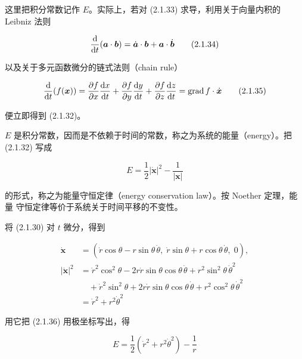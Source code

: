 这里把积分常数记作 $E$。实际上，若对 (2.1.33) 求导，利用关于向量内积的
Leibniz 法则

\begin{equation}
  \frac{\mathrm{d}}{\mathrm{d} t}(\bm{a}\cdot\bm{b})
    = \dot{\bm{a}}\cdot\bm{b} + \bm{a}\cdot\dot{\bm{b}}
  \tag{2.1.34}
\end{equation}

以及关于多元函数微分的链式法则（chain rule）

\begin{equation}
  \frac{\mathrm{d}}{\mathrm{d} t}(f(\bm{x}))
    = \frac{\partial f}{\partial x}\frac{\mathrm{d} x}{\mathrm{d} t}
    + \frac{\partial f}{\partial y}\frac{\mathrm{d} y}{\mathrm{d} t}
    + \frac{\partial f}{\partial z}\frac{\mathrm{d} z}{\mathrm{d} t}
    = \operatorname{grad} f\cdot\dot{\bm{x}}
  \tag{2.1.35}
\end{equation}

便立即得到 (2.1.32)。

$E$ 是积分常数，因而是不依赖于时间的常数，称之为系统的能量（energy）。把
(2.1.32) 写成

\begin{equation}
  E = \frac{1}{2}|\dot{\bm{x}}|^2 - \frac{1}{|\bm{x}|}
  \tag{2.1.36}
\end{equation}

的形式，称之为能量守恒定律（energy conservation law）。按 Noether 定理，能量
守恒定律等价于系统关于时间平移的不变性。

将 (2.1.30) 对 $t$ 微分，得到

\[
\begin{aligned}
  \dot{\bm{x}} &= (\dot r\cos\theta - r\sin\theta\,\dot\theta,\;
      \dot r\sin\theta + r\cos\theta\,\dot\theta,\; 0),\\
  |\dot{\bm{x}}|^2 &= \dot r^2\cos^2\theta
      - 2r\dot r\sin\theta\cos\theta\,\dot\theta
      + r^2\sin^2\theta\,\dot\theta^2\\
  &\quad + \dot r^2\sin^2\theta
      + 2r\dot r\sin\theta\cos\theta\,\dot\theta
      + r^2\cos^2\theta\,\dot\theta^2\\
  &= \dot r^2 + r^2\dot\theta^2
\end{aligned}
\]

用它把 (2.1.36) 用极坐标写出，得

\begin{equation}
  E = \frac{1}{2}(\dot r^2 + r^2\dot\theta^2) - \frac{1}{r}
  \tag{2.1.37}
\end{equation}

